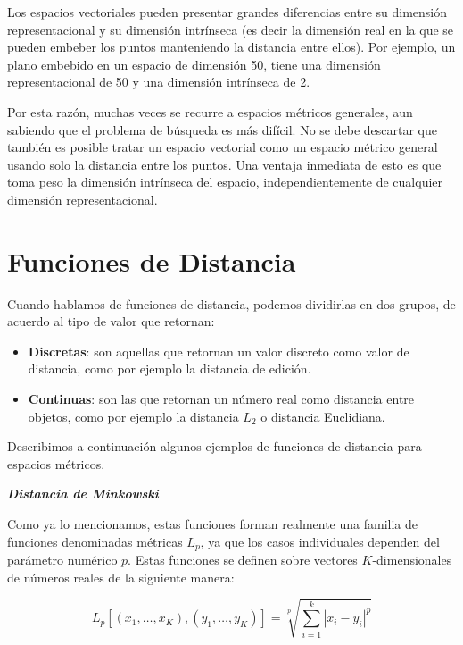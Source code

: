 Los espacios vectoriales pueden presentar grandes diferencias entre su dimensi\'on 
representacional y su dimensi\'on intr\'inseca (es decir la dimensi\'on real en la que se pueden 
embeber los puntos manteniendo la distancia entre ellos). Por ejemplo, un plano embebido en un 
espacio de dimensi\'on 50, tiene una dimensi\'on representacional de 50 y una dimensi\'on 
intr\'inseca de 2.

Por esta raz\'on, muchas veces se recurre a espacios m\'etricos generales, aun sabiendo que el 
problema de b\'usqueda es m\'as dif\'icil. No se debe descartar que tambi\'en es posible tratar un 
espacio vectorial como un espacio m\'etrico general usando solo la distancia entre los puntos. Una 
ventaja inmediata de esto es que toma peso la dimensi\'on intr\'inseca del espacio, 
independientemente de cualquier dimensi\'on representacional.

\section{Funciones de Distancia}

Cuando hablamos de funciones de distancia, podemos dividirlas en dos grupos, de acuerdo
 al tipo de valor que retornan:

\begin{itemize}
\item \textbf{Discretas}: son  aquellas que retornan un valor discreto como valor de 
distancia, como por ejemplo la distancia de edici\'on.

\item \textbf{Continuas}: son las que retornan un n\'umero real como distancia entre
objetos, como por ejemplo la distancia $L_2$ o distancia Euclidiana.

\end{itemize}


Describimos a continuaci\'on algunos ejemplos de funciones de distancia para
espacios m\'etricos. 

\noindent \textbf{\textit{Distancia de Minkowski}} 

Como ya lo mencionamos, estas funciones forman realmente una familia de 
funciones denominadas m\'etricas $L_p$, ya que los 
casos individuales dependen del par\'ametro num\'erico $p$. Estas funciones se definen sobre 
vectores $K$-dimensionales de n\'umeros reales de la siguiente manera:

\[
L_p[(x_1,\ldots,x_K),(y_1,\ldots,y_K)] = \sqrt[p]{ \sum_{i=1}^k|x_i - y_i|^p}
\]

